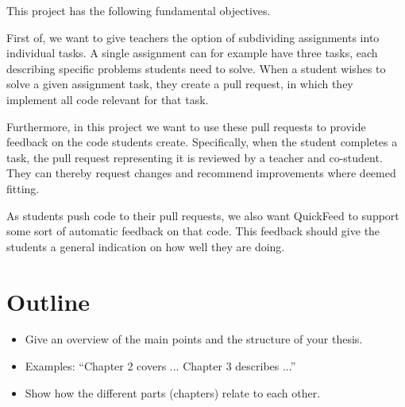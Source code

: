 This project has the following fundamental objectives.

First of, we want to give teachers the option of subdividing assignments into individual tasks.
A single assignment can for example have three tasks, each describing specific problems students need to solve.
When a student wishes to solve a given assignment task, they create a pull request, in which they implement all code relevant for that task.

Furthermore, in this project we want to use these pull requests to provide feedback on the code students create.
Specifically, when the student completes a task, the pull request representing it is reviewed by a teacher and co-student.
They can thereby request changes and recommend improvements where deemed fitting.

As students push code to their pull requests, we also want QuickFeed to support some sort of automatic feedback on that code.
This feedback should give the students a general indication on how well they are doing.

\section{Outline}

\begin{itemize}
\item Give an overview of the main points and the structure of your thesis.
\item Examples: ``Chapter 2 covers ...  Chapter 3 describes ...''
\item Show how the different parts (chapters) relate to each other.
\end{itemize}
